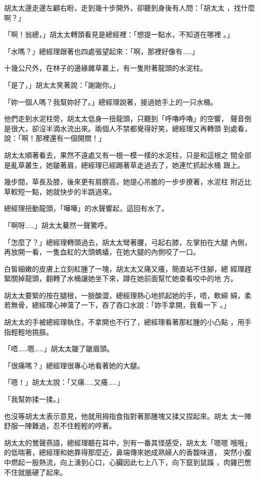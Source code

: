 胡太太邊走邊左顧右盼，走到幾十步開外，卻聽到身後有人問：「胡太太
，找什麼啊？」

「啊！翁總，」胡太太轉頭看見是總經裡：「想提一點水，不知道在哪裡
。」

「水嗎？」總經理跟著也四處張望起來：「啊，那裡好像有……」

十幾公尺外，在林子的邊緣雜草叢上，有一隻附著龍頭的水泥柱。

「是了，」胡太太笑著說：「謝謝你。」

「妳一個人嗎？我幫妳好了。」總經理說著，接過她手上的一只水桶。

他們走到水泥柱旁，胡太太低身一扭龍頭，只聽到「呼嚕呼嚕」的空響，
聲音倒是很大，卻沒半滴水流出來。兩個人不禁都覺得好笑，總經理又再轉頭
到處看，說：「啊！那裡還有一個開關！」

胡太太順著看去，果然不遠處又有一根一模一樣的水泥柱，只是和這根之
間全部是亂草叢生，她皺著眉，總經理已經踢著草走過去了，她連忙抓起水桶
跟上。

幾步間，草長及膝，後來更有肩膀高，她提心吊膽的一步步撩著，水泥柱
附近比草較短一點，她就快步的半跳過來。

總經理扭動龍頭，「嘩嘩」的水聲響起，這回有水了。

「啊呀……」胡太太驀然一聲驚呼。

「怎麼了？」總經理轉頭過去，胡太太彎著腰，弓起右膝，左掌拍在大腿
內側，再放開一看，一隻血紅的大頭螞蟻，在她大腿的內側咬了一口。

白皙細嫩的皮膚上立刻紅腫了一塊，胡太太又痛又癢，簡直站不住腳，總
經理趕緊關掉龍頭，翻轉了水桶讓她坐下來，蹲在她前面幫忙她查看咬中的地
方。

胡太太要緊的按在腿根，一臉酸澀，總經理熱心地抓起她的手，唔，軟綿
綿，柔若無骨，總經理心神蕩了一下，吞了吞口水說：「妳手拿開，我看一下
。」

胡太太的手被總經理執住，不拿開也不行了，總經理看著那紅腫的小凸點
，用手指輕輕地挑摳。

「唔……嗯……」胡太太皺了皺眉頭。

「很痛嗎？」總經理很專心地看著她的大腿。

「嗯！」胡太太說：「又痛……又癢……」

「我幫妳揉一揉。」

也沒等胡太太表示意見，他就用拇指食指對著那腫塊又揉又捏起來。胡太
太一陣舒服一陣難過，忍不住輕輕的哼著。

胡太太的鶯聲燕語，總經理聽在耳中，別有一番其怪感受，胡太太「嗯嗯
哦哦」的低喘著，總經理和她靠得那麼近，鼻端傳來她成熟婦人的香馥味道，
突然小腹中燃起一股熱流，向上湧到心口，心臟因此七上八下，向下竄到鼠蹊
，肉雞巴憋不住就脹硬了起來。

